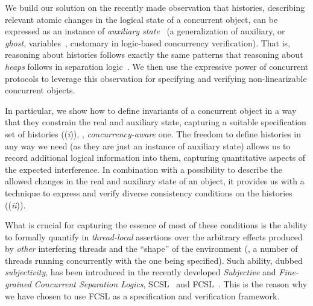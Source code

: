 We build our solution on the recently made observation that histories,
describing relevant atomic changes in the logical state of a
concurrent object, can be expressed as an instance of \emph{auxiliary
  state}~\cite{Sergey-al:ESOP15} (a generalization of auxiliary, or
\emph{ghost}, variables~\cite{Owicki-Gries:CACM76}, customary in
logic-based concurrency verification).
%
That is, reasoning about histories follows exactly the same patterns
that reasoning about \emph{heaps} follows in separation
logic~\cite{Reynolds:LICS02}.
%
We then use the expressive power of concurrent protocols to leverage
this observation for specifying and verifying non-linearizable
concurrent objects.  
%
%
%

In particular, we show how to define invariants of a concurrent object
in a way that they constrain the real and auxiliary state, capturing a
suitable specification set of histories (\cf (\emph{i})), \eg,
\emph{concurrency-aware} one.
%
The freedom to define histories in any way we need (as they are just
an instance of auxiliary state) allows us to record additional logical
information into them, capturing quantitative aspects of the expected
interference. In combination with a possibility to describe the
allowed changes in the real and auxiliary state of an object, it
provides us with a technique to express and verify diverse consistency
conditions on the histories (\cf (\emph{ii})).  

What is crucial for capturing the essence of most of these conditions
is the ability to formally quantify in \emph{thread-local} assertions
over the arbitrary effects produced by \emph{other} interfering
threads and the ``shape'' of the environment (\eg, a number of threads
running concurrently with the one being specified).
%
%
%
Such ability, dubbed \emph{subjectivity}, has been introduced in the
recently developed \emph{Subjective} and \emph{Fine-grained Concurrent
  Separation Logics}, SCSL~\cite{LeyWild-Nanevski:POPL13} and
FCSL~\cite{Nanevski-al:ESOP14}. This is the reason why we have chosen
to use FCSL as a specification and verification framework.
%


